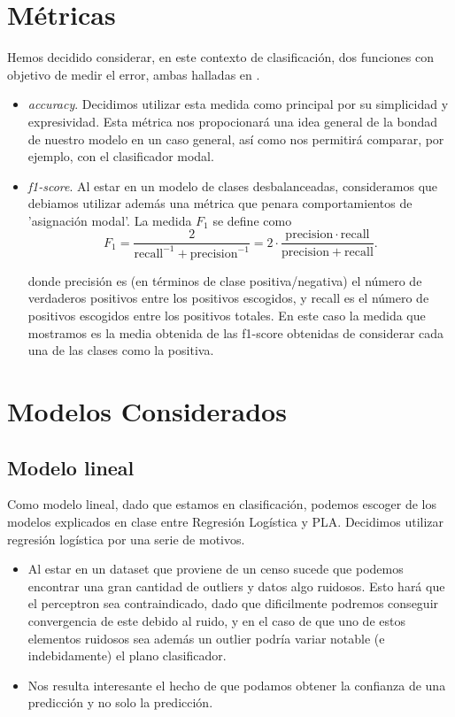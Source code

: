\documentclass[11pt,a4paper]{article}
\begin{document}
\section{ Métricas }

Hemos decidido considerar, en este contexto de clasificación, dos funciones con objetivo de medir el error, ambas halladas en \cite{met}.
\begin{itemize}
	\item \emph{accuracy}. Decidimos utilizar esta medida como principal por su simplicidad y expresividad. Esta métrica nos propocionará una idea general de la bondad de nuestro modelo en un caso general, así como nos permitirá comparar, por ejemplo, con el clasificador modal. 
	\item \emph{f1-score}. Al estar en un modelo de clases desbalanceadas, consideramos que debiamos utilizar además una métrica que penara comportamientos de 'asignación modal'. La medida $F_1$ se define como\cite{f1}
	$${\displaystyle F_{1}={\frac {2}{\mathrm {recall} ^{-1}+\mathrm {precision} ^{-1}}}=2\cdot {\frac {\mathrm {precision} \cdot \mathrm {recall} }{\mathrm {precision} +\mathrm {recall} }}}.$$
	
	donde precisión es (en términos de clase positiva/negativa) el número de verdaderos positivos entre los positivos escogidos, y recall es el número de positivos escogidos entre los positivos totales. En este caso la medida que mostramos es la media obtenida de las f1-score obtenidas de considerar cada una de las clases como la positiva.
\end{itemize}

\section{ Modelos Considerados }

\subsection{ Modelo lineal }
	
	Como modelo lineal, dado que estamos en clasificación, podemos escoger de los modelos explicados en clase entre Regresión Logística y  PLA. Decidimos utilizar regresión logística por una serie de motivos.
	
	\begin{itemize}
	\item Al estar en un dataset que proviene de un censo sucede que podemos encontrar una gran cantidad de outliers y datos algo ruidosos. Esto hará que el perceptron sea contraindicado, dado que dificilmente podremos conseguir convergencia de este debido al ruido, y en el caso de que uno de estos elementos ruidosos sea además un outlier podría variar notable (e indebidamente) el plano clasificador.
	\item Nos resulta interesante el hecho de que podamos obtener la confianza de una predicción y no solo la predicción.
\end{itemize}
\end{document}
